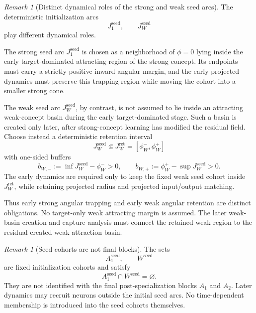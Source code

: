 \documentclass{article} %
\theoremstyle{plain}
\theoremstyle{definition}
\theoremstyle{remark}
\newtheorem{remark}[theorem]{Remark}
\begin{document}
\begin{remark}[Distinct dynamical roles of the strong and weak seed arcs]
\label{rem:seed-basin-margin}
The deterministic initialization arcs
\[
J_1^{\mathrm{seed}},
\qquad
J_W^{\mathrm{seed}}
\]
play different dynamical roles.

The strong seed arc $J_1^{\mathrm{seed}}$ is chosen as a neighborhood of
$\phi=0$ lying inside the early target-dominated attracting region of the
strong concept.  Its endpoints must carry a strictly positive inward angular
margin, and the early projected dynamics must preserve this trapping region
while moving the cohort into a smaller strong cone.

The weak seed arc $J_W^{\mathrm{seed}}$, by contrast, is not assumed to lie
inside an attracting weak-concept basin during the early target-dominated
stage.  Such a basin is created only later, after strong-concept learning has
modified the residual field.  Choose instead a deterministic retention
interval
\[
J_W^{\mathrm{seed}}
\Subset
J_W^{\mathrm{ret}}
=
[\phi_W^-,\phi_W^+]
\]
with one-sided buffers
\[
b_{W,-}
:=
\inf J_W^{\mathrm{seed}}-\phi_W^->0,
\qquad
b_{W,+}
:=
\phi_W^+-\sup J_W^{\mathrm{seed}}>0.
\]
The early dynamics are required only to keep the fixed weak seed cohort
inside $J_W^{\mathrm{ret}}$, while retaining projected radius and projected
input/output matching.

Thus early strong angular trapping and early weak angular retention are
distinct obligations.  No target-only weak attracting margin is assumed.
The later weak-basin creation and capture analysis must connect the retained
weak region to the residual-created weak attraction basin.
\end{remark}

\begin{remark}[Seed cohorts are not final blocks]
\label{rem:init-seeds-not-blocks}
The sets
\[
A_1^{\mathrm{seed}},
\qquad
W^{\mathrm{seed}}
\]
are fixed initialization cohorts and satisfy
\[
A_1^{\mathrm{seed}}\cap W^{\mathrm{seed}}=\varnothing.
\]
They are not identified with the final post-specialization blocks $A_1$ and
$A_2$. Later dynamics may recruit neurons outside the initial seed arcs. No
time-dependent membership is introduced into the seed cohorts themselves.
\end{remark}
\end{document}
